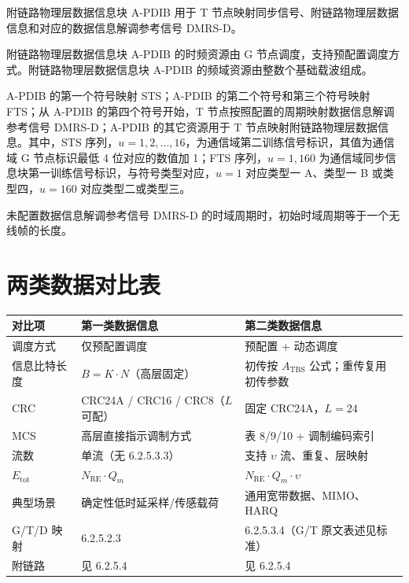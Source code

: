 \documentclass[11pt,a4paper]{ctexart}
\begin{document}
附链路物理层数据信息块 A-PDIB 用于 T 节点映射同步信号、附链路物理层数据信息和对应的数据信息解调参考信号 DMRS-D。

附链路物理层数据信息块 A-PDIB 的时频资源由 G 节点调度，支持预配置调度方式。附链路物理层数据信息块 A-PDIB 的频域资源由整数个基础载波组成。

A-PDIB 的第一个符号映射 STS；A-PDIB 的第二个符号和第三个符号映射 FTS；从 A-PDIB 的第四个符号开始，T 节点按照配置的周期映射数据信息解调参考信号 DMRS-D；A-PDIB 的其它资源用于 T 节点映射附链路物理层数据信息。其中，STS 序列，$u = 1, 2, \ldots, 16$，为通信域第二训练信号标识，其值为通信域 G 节点标识最低 4 位对应的数值加 1；FTS 序列，$u = 1, 160$ 为通信域同步信息块第一训练信号标识，与符号类型对应，$u = 1$ 对应类型一 A、类型一 B 或类型四，$u = 160$ 对应类型二或类型三。

未配置数据信息解调参考信号 DMRS-D 的时域周期时，初始时域周期等于一个无线帧的长度。

\section{两类数据对比表}

\begin{table}[h]
\centering
\small
\begin{tabular}{p{3.2cm}p{5.5cm}p{5.5cm}}
\toprule
\textbf{对比项} & \textbf{第一类数据信息} & \textbf{第二类数据信息} \\
\midrule
调度方式 & 仅预配置调度 & 预配置 + 动态调度 \\
信息比特长度 & $B = K \cdot N$（高层固定） & 初传按 $A_{\mathrm{TBS}}$ 公式；重传复用初传参数 \\
CRC & CRC24A / CRC16 / CRC8（$L$ 可配） & 固定 CRC24A，$L=24$ \\
MCS & 高层直接指示调制方式 & 表 8/9/10 + 调制编码索引 \\
流数 & 单流（无 6.2.5.3.3） & 支持 $\upsilon$ 流、重复、层映射 \\
$E_{\mathrm{tot}}$ & $N_{\mathrm{RE}} \cdot Q_m$ & $N_{\mathrm{RE}} \cdot Q_m \cdot \upsilon$ \\
典型场景 & 确定性低时延采样/传感载荷 & 通用宽带数据、MIMO、HARQ \\
G/T/D 映射 & 6.2.5.2.3 & 6.2.5.3.4（G/T 原文表述见标准） \\
附链路 & 见 6.2.5.4 & 见 6.2.5.4 \\
\bottomrule
\end{tabular}
\end{table}
\end{document}
